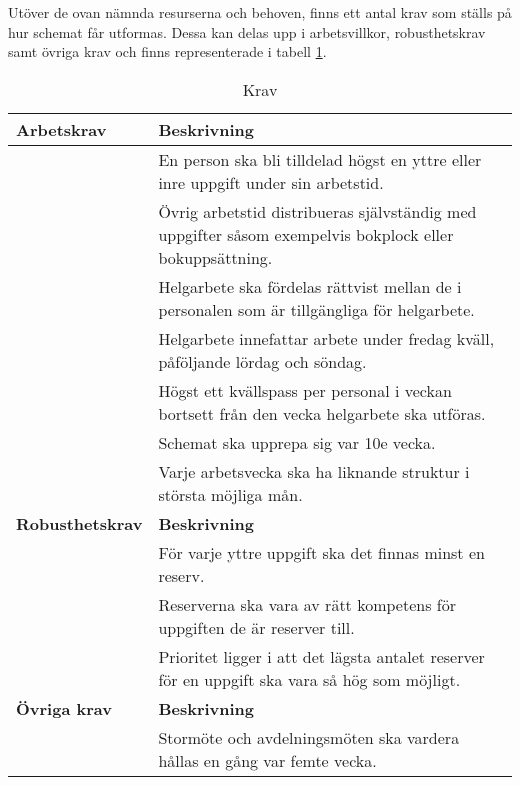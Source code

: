 Utöver de ovan nämnda resurserna och behoven, finns ett antal krav som ställs på hur schemat får utformas. Dessa kan delas upp i arbetsvillkor, robusthetskrav samt övriga krav och finns representerade i tabell \ref{int:3}.

\begin{table}[H]
\caption{Krav}
\label{int:3}
\begin{tabular}{|l|l|}
\hline
\textbf{Arbetskrav} & \textbf{Beskrivning} \\ \hline
& En person ska bli tilldelad högst en yttre eller inre uppgift under sin arbetstid. 
\\ \hline 
& Övrig arbetstid distribueras självständig med uppgifter såsom exempelvis bokplock eller bokuppsättning.
\\ \hline
 & Helgarbete ska fördelas rättvist mellan de i personalen som är tillgängliga för helgarbete. 
\\ \hline 
 & Helgarbete innefattar arbete under fredag kväll, påföljande lördag och söndag.
\\ \hline 
 & Högst ett kvällspass per personal i veckan bortsett från den vecka helgarbete ska utföras.
\\ \hline 
 & Schemat ska upprepa sig var 10e vecka.
\\ \hline 
 & Varje arbetsvecka ska ha liknande struktur i största möjliga mån.
\\ \hline 

\textbf{Robusthetskrav} & \textbf{Beskrivning} \\ \hline
 & För varje yttre uppgift ska det finnas minst en reserv.
\\ \hline 
 & Reserverna ska vara av rätt kompetens för uppgiften de är reserver till.
\\ \hline 
 & Prioritet ligger i att det lägsta antalet reserver för en uppgift ska vara så hög som möjligt.
\\ \hline 

\textbf{Övriga krav} & \textbf{Beskrivning} \\ \hline
 & Stormöte och avdelningsmöten ska vardera hållas en gång var femte vecka.
\\ \hline 
\end{tabular}
\end{table}
\medskip



